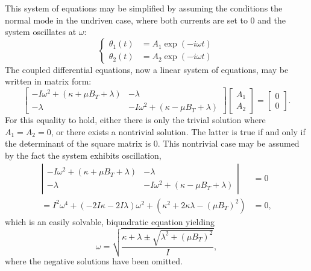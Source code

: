 \documentclass{article}
\begin{document}
This system of equations may be simplified by assuming the conditions the normal mode in the undriven case, where both currents are set to 0 and the system oscillates at $\omega$:
\begin{equation*}
    \begin{cases}
        \theta_1(t) &= A_1 \exp(-i\omega t) \\
        \theta_2(t) &= A_2 \exp(-i\omega t)
    \end{cases}
\end{equation*}
The coupled differential equations, now a linear system of equations, may be written in matrix form:
\begin{equation*}
    \left[ \begin{matrix}
        -I\omega^2+(\kappa + \mu B_T + \lambda)   &   -\lambda \\
        -\lambda                                    &   -I\omega^2+(\kappa - \mu B_T + \lambda)
    \end{matrix} \right]\left[ \begin{matrix} A_1 \\ A_2 \end{matrix} \right] = \left[ \begin{matrix} 0\\0 \end{matrix} \right].
\end{equation*}
For this equality to hold, either there is only the trivial solution where $A_1=A_2=0$, or there exists a nontrivial solution. The latter is true if and only if the determinant of the square matrix is 0.
This nontrivial case may be assumed by the fact the system exhibits oscillation,
\begin{equation*}
    \begin{aligned}
        \left| \begin{matrix}
        -I\omega^2+(\kappa + \mu B_T + \lambda)   &   -\lambda \\
        -\lambda                                    &   -I\omega^2+(\kappa - \mu B_T + \lambda)
    \end{matrix} \right| &= 0 \\
    = I^2 \omega^4 + \left(-2I\kappa-2I\lambda \right)\omega^2 + \left(\kappa^2 + 2\kappa\lambda - (\mu B_T)^2\right) &= 0,
    \end{aligned}
\end{equation*}
which is an easily solvable, biquadratic equation yielding
\begin{equation}
    \omega = \sqrt{\frac{\kappa+\lambda \pm \sqrt{\lambda^2 + \left(\mu B_T\right)^2}}{I}},\label{eq:omegar}
\end{equation}
where the negative solutions have been omitted.
\end{document}
